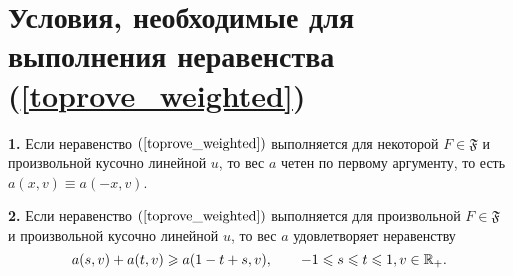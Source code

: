 \section{Условия, необходимые для выполнения неравенства (\ref{toprove_weighted})}
\begin{thm}
\label{necessary_conditions_constant}
\textbf{1.}
Если неравенство $(\ref{toprove_weighted})$ выполняется для некоторой $F \in \mathfrak{F}$
и произвольной кусочно линейной $u$,
то вес $a$ четен по первому аргументу,
то есть $a(x, v) \equiv a(-x, v)$.

\textbf{2.}
Если неравенство $(\ref{toprove_weighted})$ выполняется для произвольной $F \in \mathfrak{F}$
и произвольной кусочно линейной $u$, то вес $a$ удовлетворяет неравенству
\begin{equation}
\label{almostConcave}
a(s, v) + a(t, v) \ge a(1 - t + s, v), \qquad -1 \le s \le t \le 1, v \in \Real_+.
\end{equation}
\end{thm}


